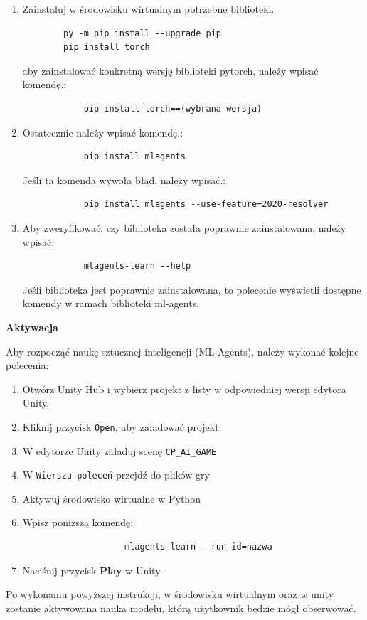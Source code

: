 \documentclass[a4paper,twoside,12pt]{book}
\begin{document}
\begin{itemize}
\begin{enumerate}
	\item Zainstaluj w środowisku wirtualnym potrzebne biblioteki.
		\begin{verbatim}
		py -m pip install --upgrade pip
		pip install torch
		\end{verbatim}
		aby zainstalować konkretną wersję biblioteki pytorch, należy wpisać komendę.:
		\begin{verbatim}
			pip install torch==(wybrana wersja)
		\end{verbatim}
	\item	Ostatecznie należy wpisać komendę.:
		\begin{verbatim}
			pip install mlagents
		\end{verbatim}
		Jeśli ta komenda wywoła błąd, należy wpisać.:
		\begin{verbatim}
			pip install mlagents --use-feature=2020-resolver
		\end{verbatim}
	\item	Aby zweryfikować, czy biblioteka została poprawnie zainstalowana, należy wpisać:
		\begin{verbatim}
			mlagents-learn --help
		\end{verbatim}
		Jeśli biblioteka jest poprawnie zainstalowana, to polecenie wyświetli dostępne komendy w ramach biblioteki ml-agents.
	\end{enumerate}
\end{itemize}
	\textbf{Aktywacja}
	
	Aby rozpocząć naukę sztucznej inteligencji (ML-Agents), należy wykonać kolejne polecenia:
	\begin{enumerate}
			\item Otwórz Unity Hub i wybierz projekt z listy w odpowiedniej wersji edytora Unity.
			\item Kliknij przycisk \texttt{Open}, aby załadować projekt.
			\item W edytorze Unity załaduj scenę \texttt{CP\_AI\_GAME}
			\item W \texttt{Wierszu poleceń} przejdź do plików gry
			\item Aktywuj środowisko wirtualne w Python
			\item Wpisz poniższą komendę:
				\begin{verbatim}
					mlagents-learn --run-id=nazwa
				\end{verbatim}
			\item Naciśnij przycisk \textbf{Play} w Unity.
	\end{enumerate}
	Po wykonaniu powyższej instrukcji, w środowisku wirtualnym oraz w unity zostanie aktywowana nauka modelu, którą użytkownik będzie mógł obserwować.
	
\end{document}
